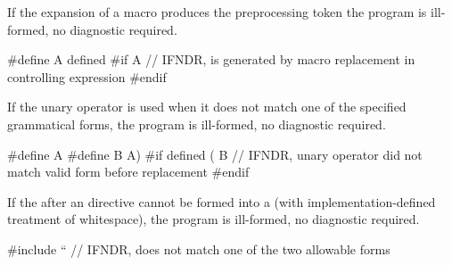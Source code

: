 \pnum
If the expansion of a macro produces the preprocessing token 
the program is ill-formed, no diagnostic required.

\pnum
\begin{example}
\begin{codeblock}
#define A defined
#if A   // IFNDR,  is generated by macro replacement in controlling expression
#endif
\end{codeblock}
\end{example}


\pnum
If the  unary operator is used when it
does not match
one of the specified grammatical forms,
the program is ill-formed, no diagnostic required.

\pnum
\begin{example}
\begin{codeblock}
#define A
#define B A)
#if defined ( B // IFNDR, unary operator  did not match valid form before replacement
#endif
\end{codeblock}
\end{example}


\pnum
If the  after
an  directive
cannot be formed into a 
(with imp\-lementation-defined treatment of whitespace),
the program is ill-formed, no diagnostic required.

\pnum
\begin{example}
\begin{codeblock}
#include ``     // IFNDR, does not match one of the two allowable forms
\end{codeblock}
\end{example}

